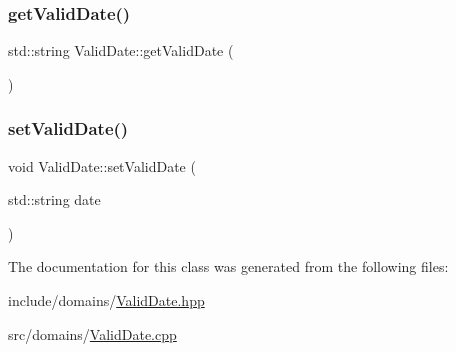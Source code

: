 \subsubsection{\texorpdfstring{getValidDate()}{getValidDate()}}
{\footnotesize\ttfamily std\+::string Valid\+Date\+::get\+Valid\+Date (\begin{DoxyParamCaption}{ }\end{DoxyParamCaption})}

\mbox{\label{class_valid_date_a28905a1bdaa71556225b7e565735364c}} 
\subsubsection{\texorpdfstring{setValidDate()}{setValidDate()}}
{\footnotesize\ttfamily void Valid\+Date\+::set\+Valid\+Date (\begin{DoxyParamCaption}\item[{std\+::string}]{date }\end{DoxyParamCaption})}



The documentation for this class was generated from the following files\+:\begin{DoxyCompactItemize}
\item 
include/domains/\mbox{\hyperlink{_valid_date_8hpp}{Valid\+Date.\+hpp}}\item 
src/domains/\mbox{\hyperlink{_valid_date_8cpp}{Valid\+Date.\+cpp}}\end{DoxyCompactItemize}
